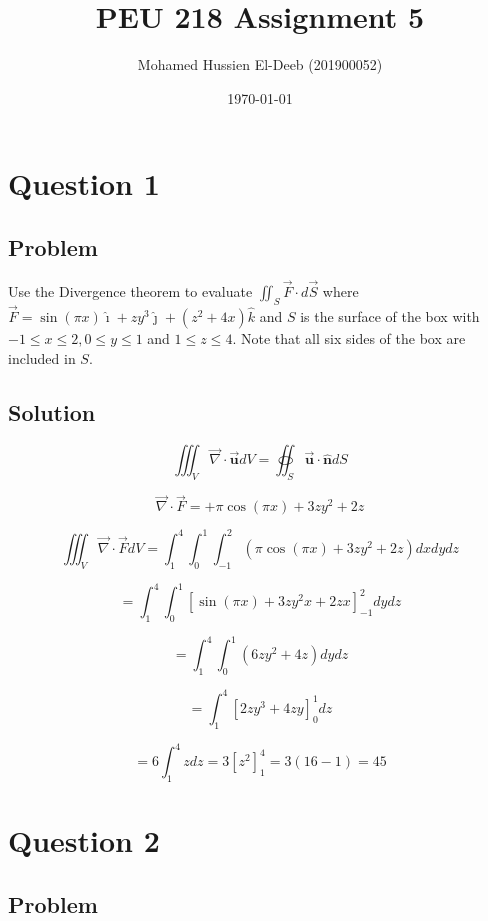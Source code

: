 \documentclass[12pt]{article}
\title{PEU 218 Assignment 5}
\author{Mohamed Hussien El-Deeb (201900052)}
\date{\today}
\begin{document}
\maketitle
\tableofcontents
\hypersetup{linkcolor=RoyalBlue4}

\newpage
\section{Question 1}

\subsection{Problem}

Use the Divergence theorem to evaluate \(\iint_S \vec{F} \cdot d \vec{S}\) where \(\vec{F}=\sin (\pi x) \hat{\imath}+z y^3 \hat{\jmath}+\left(z^2+4 x\right) \hat{k}\) and \(S\) is the surface of the box with \(-1 \leq x \leq 2,0 \leq y \leq 1\) and \(1 \leq z \leq 4\). Note that all six sides of the box are included in \(S\).

\subsection{Solution}

\[
    \iiint_V \vec{\nabla} \cdot \overrightarrow{\boldsymbol{u}} d V=\oiint_S \overrightarrow{\boldsymbol{u}} \cdot \widehat{\boldsymbol{n}} d S
\]

\[
    \vec{\nabla} \cdot \vec{F} =
    + \pi \cos (\pi x)
    + 3 z y^2
    + 2 z
\]

\[
    \iiint_V \vec{\nabla} \cdot \vec{F} d V
    = \int_{1}^{4} \int_{0}^{1} \int_{-1}^{2} \left( \pi \cos (\pi x) + 3 z y^2 + 2 z \right) d x d y d z
\]

\[
    = \int_{1}^{4} \int_{0}^{1} {\left[ \sin (\pi x) + 3 z y^2 x + 2 z x \right]}_{-1}^{2} d y d z
\]

\[
    = \int_{1}^{4} \int_{0}^{1} \left( 6 z y^2 + 4 z \right) d y d z
\]

\[
    = \int_{1}^{4} {\left[ 2 z y^3 + 4 z y \right]}_{0}^{1} d z
\]

\[
    = 6 \int_{1}^{4} z d z
    = 3 {\left[ z^2 \right]}_{1}^{4}
    = 3 \left( 16 - 1 \right)
    = 45
\]

\newpage
\section{Question 2}

\subsection{Problem}
\end{document}
